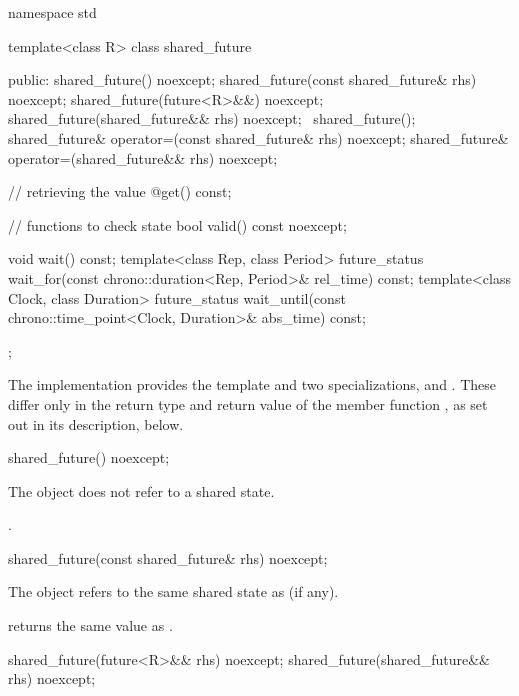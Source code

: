 %
\begin{codeblock}
namespace std {
  template<class R>
  class shared_future {
  public:
    shared_future() noexcept;
    shared_future(const shared_future& rhs) noexcept;
    shared_future(future<R>&&) noexcept;
    shared_future(shared_future&& rhs) noexcept;
    ~shared_future();
    shared_future& operator=(const shared_future& rhs) noexcept;
    shared_future& operator=(shared_future&& rhs) noexcept;

    // retrieving the value
    @\seebelow@ get() const;

    // functions to check state
    bool valid() const noexcept;

    void wait() const;
    template<class Rep, class Period>
      future_status wait_for(const chrono::duration<Rep, Period>& rel_time) const;
    template<class Clock, class Duration>
      future_status wait_until(const chrono::time_point<Clock, Duration>& abs_time) const;
  };
}
\end{codeblock}

\pnum
The implementation provides the template  and two
specializations,  and . These
differ only in the return type and return value of the member function , as
set out in its description, below.

%
\begin{itemdecl}
shared_future() noexcept;
\end{itemdecl}

\begin{itemdescr}
\pnum
\effects
The object does not refer to a shared state.

\pnum
\ensures
{}.
\end{itemdescr}

%
\begin{itemdecl}
shared_future(const shared_future& rhs) noexcept;
\end{itemdecl}

\begin{itemdescr}
\pnum
\effects
The object refers to the same
shared state as  (if any).

\pnum
\ensures
{} returns the same value as .
\end{itemdescr}

%
\begin{itemdecl}
shared_future(future<R>&& rhs) noexcept;
shared_future(shared_future&& rhs) noexcept;
\end{itemdecl}

